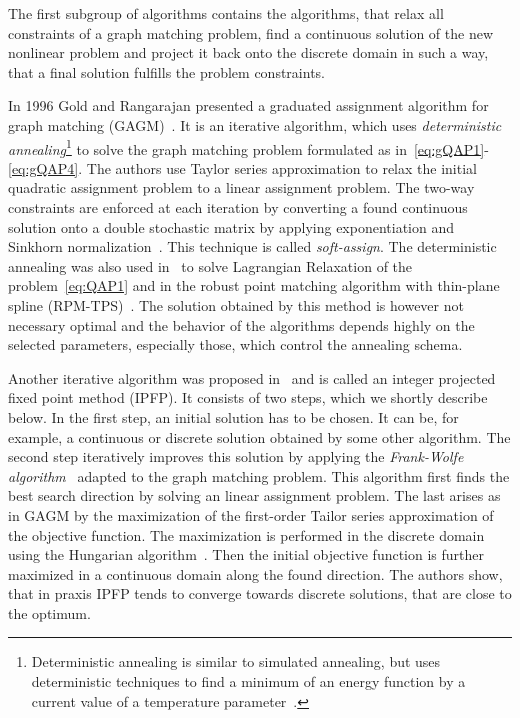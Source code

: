 The first subgroup of algorithms contains the algorithms, that relax all constraints of a graph matching problem, find a continuous solution of the new nonlinear problem and project it back onto the discrete domain in such a way, that a final solution fulfills the problem constraints. 

In 1996 Gold and Rangarajan presented a graduated assignment algorithm for graph matching (GAGM)~\cite{Rangarajan1996_GAGM}. It is an iterative algorithm, which uses \emph{deterministic annealing}\footnote{Deterministic annealing is similar to simulated annealing, but uses deterministic techniques to find a minimum of an energy function by a current value of a temperature parameter~\cite{Rose1991_DA}.} to solve the graph matching problem formulated as in~\eqref{eq:gQAP1}-\eqref{eq:gQAP4}. The authors use Taylor series approximation to relax the initial quadratic assignment problem to a linear assignment problem. The two-way constraints are enforced at each iteration by converting a  found continuous solution onto a double stochastic matrix by applying exponentiation and Sinkhorn normalization~\cite{Sinkhorn1964}. This technique is called \emph{soft-assign}. The deterministic annealing was also used in~\cite{Rangarajan96_LagRelax} to solve Lagrangian Relaxation of the problem~\eqref{eq:QAP1} and in the robust point matching algorithm with thin-plane spline (RPM-TPS)~\cite{Chui2003}. The solution obtained by this method is however not necessary optimal and the behavior of the algorithms depends highly on the selected parameters, especially those, which control the annealing schema.

Another iterative algorithm was proposed in~\cite{Leordeanu2009_IPFP} and is called an integer projected fixed point method (IPFP). It consists of two steps, which we shortly describe below. In the first step, an initial solution has to be chosen. It can be, for example, a continuous or discrete solution obtained by some other algorithm. The second step iteratively improves this solution by applying the \emph{Frank-Wolfe algorithm}~\cite{Wolfe1956} adapted to the graph matching problem. This algorithm first finds the best search direction by solving an linear assignment problem. The last arises as in GAGM by the maximization of the first-order Tailor series approximation of the objective function. The maximization is performed in the discrete domain using the Hungarian algorithm~\cite{Kuhn1955}. Then the initial objective function is further maximized in a continuous domain along the found direction. The authors show, that in praxis IPFP tends to converge towards discrete solutions, that are close to the optimum.


